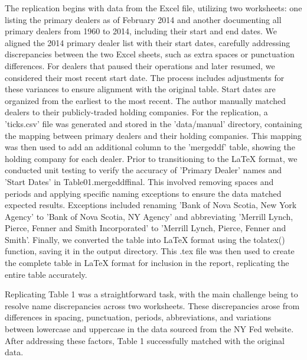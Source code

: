 \documentclass{article}
\begin{document}
The replication begins with data from the Excel file, utilizing two worksheets: one listing the primary dealers as of February 2014 and another documenting all primary dealers from 1960 to 2014, including their start and end dates. We aligned the 2014 primary dealer list with their start dates, carefully addressing discrepancies between the two Excel sheets, such as extra spaces or punctuation differences.  For dealers that paused their operations and later resumed, we considered their most recent start date. The process includes adjustments for these variances to ensure alignment with the original table. Start dates are organized from the earliest to the most recent. The author manually matched dealers to their publicly-traded holding companies. For the replication, a 'ticks.csv' file was generated and stored in the 'data/manual' directory, containing the mapping between primary dealers and their holding companies. This mapping was then used to add an additional column to the 'mergeddf' table, showing the holding company for each dealer. Prior to transitioning to the LaTeX format, we conducted unit testing to verify the accuracy of 'Primary Dealer' names and 'Start Dates' in Table01.mergeddffinal. This involved removing spaces and periods and applying specific naming exceptions to ensure the data matched expected results. Exceptions included renaming 'Bank of Nova Scotia, New York Agency' to 'Bank of Nova Scotia, NY Agency' and abbreviating 'Merrill Lynch, Pierce, Fenner and Smith Incorporated' to 'Merrill Lynch, Pierce, Fenner and Smith'. Finally, we converted the table into LaTeX format using the tolatex() function, saving it in the output directory. This .tex file was then used to create the complete table in LaTeX format for inclusion in the report, replicating the entire table accurately.

Replicating Table 1 was a straightforward task, with the main challenge being to resolve name discrepancies across two worksheets. These discrepancies arose from differences in spacing, punctuation, periods, abbreviations, and variations between lowercase and uppercase in the data sourced from the NY Fed website. After addressing these factors, Table 1 successfully matched with the original data.

\clearpage
\end{document}
